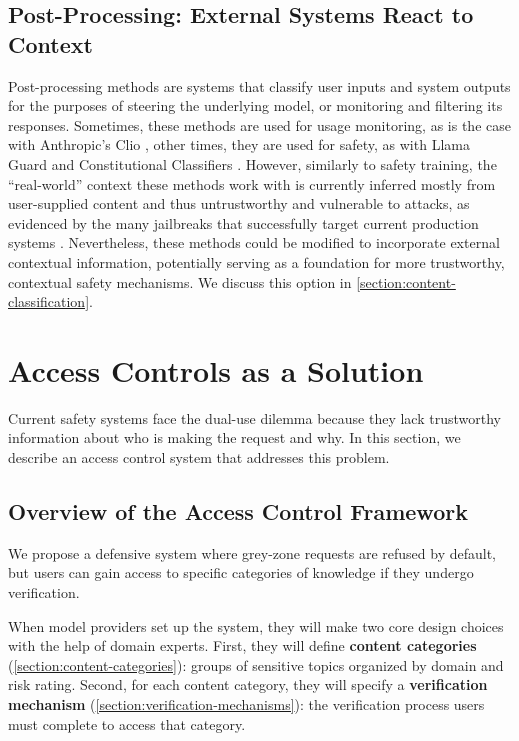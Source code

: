 \documentclass{article}
\theoremstyle{plain}
\theoremstyle{definition}
\theoremstyle{remark}
\begin{document}
\subsection{Post-Processing: External Systems React to Context} \label{section:post-processing}

Post-processing methods are systems that classify user inputs and system outputs for the purposes of steering the underlying model, or monitoring and filtering its responses.
Sometimes, these methods are used for usage monitoring, as is the case with Anthropic's Clio \cite{tamkin2024clioprivacypreservinginsightsrealworld, handa2025economictasksperformedai}, other times, they are used for safety, as with Llama Guard \cite{inan2023llamaguardllmbasedinputoutput} and Constitutional Classifiers \cite{sharma2025constitutionalclassifiersdefendinguniversal}.
However, similarly to safety training, the ``real-world'' context these methods work with is currently inferred mostly from user-supplied content and thus untrustworthy and vulnerable to attacks, as evidenced by the many jailbreaks that successfully target current production systems \cite{zhang2025outputconstraintsattacksurface}.
Nevertheless, these methods could be modified to incorporate external contextual information, potentially serving as a foundation for more trustworthy, contextual safety mechanisms. We discuss this option in \cref{section:content-classification}.

\section{Access Controls as a Solution}
\label{section:access-controls}

Current safety systems face the dual-use dilemma because they lack trustworthy information about who is making the request and why.
In this section, we describe an access control system that addresses this problem.

\subsection{Overview of the Access Control Framework} \label{section:access-control-overview}

We propose a defensive system where grey-zone requests are refused by default, but users can gain access to specific categories of knowledge if they undergo verification.

When model providers set up the system, they will make two core design choices with the help of domain experts.
First, they will define \textbf{content categories} (\cref{section:content-categories}): groups of sensitive topics organized by domain and risk rating.
Second, for each content category, they will specify a \textbf{verification mechanism} (\cref{section:verification-mechanisms}): the verification process users must complete to access that category.
\end{document}
